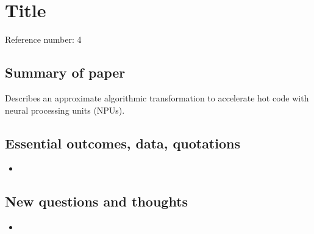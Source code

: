 \section*{Title}
Reference number: 4

\subsection*{Summary of paper}
Describes an approximate algorithmic transformation to accelerate hot code with neural processing units (NPUs).

\subsection*{Essential outcomes, data, quotations}
\begin{itemize}
	\item 
\end{itemize}

\subsection*{New questions and thoughts}
\begin{itemize}
	\item 
\end{itemize}

